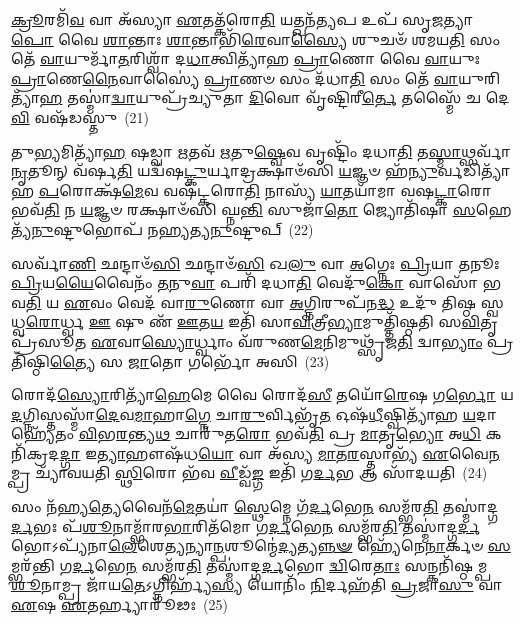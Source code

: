 {\anuvakamend[{𑌐𑌵 \ul{𑌪}\-𑌶𑍂𑌨𑌿𑌤𑌿᳴ 𑌗𑍃𑌣𑌾𑌤𑌿 𑌹𑍋\-\ul{𑌤}\-𑌰𑌿𑌤𑌿᳴ \ul{𑌸}\-𑌪𑍍𑌤𑌵𑌿𑍞᳴𑌶𑌤𑌿𑌶𑍍𑌚}]}%

\-\ul{𑌕𑍍𑌰𑍂}\-𑌰𑌮𑌿᳴\-\ul{𑌵} 𑌵𑌾 𑌅᳴𑌸𑍍𑌯𑌾 \ul{𑌏}\-𑌤𑌤𑍍𑌕᳴𑌰𑍋\-\ul{𑌤𑌿} 𑌯𑌤𑍍𑌖𑌨᳴\-\ul{𑌤𑍍𑌯}\-𑌪 𑌉𑌪᳴ 𑌸𑍃\-\ul{𑌜}\-𑌤𑍍𑌯𑌾\-\ul{𑌪𑍋} 𑌵𑍈 \ul{𑌶𑌾}\-𑌨𑍍𑌤𑌾𑌃 \ul{𑌶𑌾}\-𑌨𑍍𑌤𑌾𑌭𑌿᳴\-\ul{𑌰𑍇}\-𑌵𑌾\-\ul{𑌸𑍍𑌯𑍈} 𑌶𑍁𑌚𑍞᳴ 𑌶𑌮𑌯\-\ul{𑌤𑌿} 𑌸𑌂 𑌤𑍇᳴ \ul{𑌵𑌾}\-𑌯𑍁𑌰𑍍𑌮𑌾᳴\-\ul{𑌤}\-𑌰𑌿𑌶𑍍𑌵𑌾᳴ 𑌦\-\ul{𑌧𑌾}\-𑌤𑍍𑌵𑌿𑌤𑍍𑌯𑌾᳴𑌹 \ul{𑌪𑍍𑌰𑌾}\-𑌣𑍋 𑌵𑍈 \ul{𑌵𑌾}\-𑌯𑍁𑌃 \ul{𑌪𑍍𑌰𑌾}\-𑌣𑍇\-\ul{𑌨𑍈}\-𑌵𑌾𑌸𑍍𑌯𑍈॑ \ul{𑌪𑍍𑌰𑌾}\-𑌣𑍞 𑌸𑌂 𑌦᳴𑌧𑌾\-\ul{𑌤𑌿} 𑌸𑌂 𑌤𑍇᳴ \ul{𑌵𑌾}\-𑌯𑍁𑌰𑌿𑌤𑍍𑌯𑌾᳴\-\ul{𑌹} 𑌤𑌸𑍍𑌮𑌾॑\-\ul{𑌦𑍍𑌵𑌾}\-𑌯𑍁𑌪𑍍𑌰᳴𑌚𑍍𑌯𑍁𑌤𑌾 \ul{𑌦𑌿}\-𑌵𑍋 𑌵𑍃᳴𑌷𑍍𑌟𑌿𑌰𑍀\-\ul{𑌰𑍍𑌤𑍇} 𑌤𑌸𑍍𑌮𑍈᳴ 𑌚 𑌦𑍇\-\ul{𑌵𑌿} 𑌵𑌷᳴𑌡𑌸𑍍𑌤𑍁~(21)

𑌤𑍁\-\ul{𑌭𑍍𑌯}\-𑌮𑌿𑌤𑍍𑌯𑌾᳴\-\ul{𑌹} 𑌷𑌡𑍍𑌵𑌾 \ul{𑌋}\-𑌤𑌵᳴ \ul{𑌋}\-𑌤𑍁\-\ul{𑌷𑍍𑌵𑍇}\-𑌵 𑌵𑍃𑌷𑍍𑌟𑌿𑌂᳴ 𑌦𑌧𑌾\-\ul{𑌤𑌿} 𑌤\-\ul{𑌸𑍍𑌮𑌾}\-𑌥𑍍𑌸𑌰𑍍𑌵𑌾᳴\-\ul{𑌨𑍃}\-𑌤𑍂𑌨𑍍 𑌵᳴𑌰𑍍\mbox{}𑌷\-\ul{𑌤𑌿} 𑌯𑌦𑍍𑌵᳴𑌷\-\ul{𑌟𑍍𑌕𑍁}\-𑌰𑍍𑌯𑌾𑌦𑍍𑌰𑌕𑍍𑌷𑌾𑍞᳴𑌸𑌿 \ul{𑌯}\-𑌜𑍍𑌞𑍞 𑌹᳴\-\ul{𑌨𑍍𑌯𑍁}\-𑌰𑍍𑌵𑌡𑌿𑌤𑍍𑌯𑌾᳴𑌹 \ul{𑌪}\-𑌰𑍋𑌕𑍍𑌷᳴\-\ul{𑌮𑍇}\-𑌵 𑌵𑌷᳴𑌟𑍍𑌕𑌰𑍋\-\ul{𑌤𑌿} 𑌨𑌾𑌸𑍍𑌯᳴ \ul{𑌯𑌾}\-𑌤𑌯𑌾᳴𑌮𑌾 𑌵𑌷\-\ul{𑌟𑍍𑌕𑌾}\-𑌰𑍋 𑌭𑌵᳴\-\ul{𑌤𑌿} 𑌨 \ul{𑌯}\-𑌜𑍍𑌞𑍞 𑌰𑌕𑍍𑌷𑌾𑍞᳴𑌸𑌿 𑌘𑍍𑌨\-\ul{𑌨𑍍𑌤𑌿} 𑌸𑍁𑌜𑌾᳴\-\ul{𑌤𑍋} 𑌜𑍍𑌯𑍋𑌤𑌿᳴𑌷𑌾 \ul{𑌸}\-𑌹𑍇𑌤𑍍𑌯᳴\-\ul{𑌨𑍁}\-𑌷𑍍𑌟𑍁𑌭𑍋𑌪᳴ 𑌨𑌹𑍍𑌯𑌤𑍍𑌯\-\ul{𑌨𑍁}\-𑌷𑍍𑌟𑍁𑌪𑍍~(22)

𑌸𑌰𑍍𑌵𑌾᳴\-\ul{𑌣𑌿} 𑌛𑌨𑍍𑌦𑌾𑍞᳴\-\ul{𑌸𑌿} 𑌛𑌨𑍍𑌦𑌾𑍞᳴\-\ul{𑌸𑌿} 𑌖\-\ul{𑌲𑍁} 𑌵𑌾 \ul{𑌅}\-𑌗𑍍𑌨𑍇𑌃 \ul{𑌪𑍍𑌰𑌿}\-𑌯𑌾 \ul{𑌤}\-𑌨𑍂𑌃 \ul{𑌪𑍍𑌰𑌿}\-𑌯\-\ul{𑌯𑍈}\-𑌵𑍈𑌨𑌂᳴ \ul{𑌤}\-𑌨𑍁\-\ul{𑌵𑌾} 𑌪𑌰𑌿᳴ 𑌦𑌧𑌾\-\ul{𑌤𑌿} 𑌵𑍇𑌦𑍁᳴\-\ul{𑌕𑍋} 𑌵𑌾𑌸𑍋᳴ 𑌭𑌵\-\ul{𑌤𑌿} 𑌯 \ul{𑌏}\-𑌵𑌂 𑌵𑍇𑌦᳴ 𑌵𑌾\-\ul{𑌰𑍁}\-𑌣𑍋 𑌵𑌾 \ul{𑌅}\-𑌗𑍍𑌨𑌿𑌰𑍁𑌪᳴𑌨\-\ul{𑌦𑍍𑌧} 𑌉𑌦𑍁᳴ 𑌤𑌿𑌷𑍍𑌠 𑌸𑍍𑌵𑌧𑍍𑌵\-\ul{𑌰𑍋}\-𑌰𑍍𑌧𑍍𑌵 \ul{𑌊} 𑌷𑍁 𑌣᳴ \ul{𑌊}\-𑌤\-\ul{𑌯} 𑌇𑌤𑌿᳴ 𑌸𑌾\-\ul{𑌵𑌿}\-𑌤𑍍𑌰𑍀\-\ul{𑌭𑍍𑌯𑌾}\-𑌮𑍁𑌤𑍍𑌤𑌿᳴𑌷𑍍𑌠𑌤𑌿 𑌸\-\ul{𑌵𑌿}\-𑌤𑍃𑌪𑍍𑌰᳴𑌸𑍂𑌤 \ul{𑌏}\-𑌵𑌾\-\ul{𑌸𑍍𑌯𑍋}\-𑌰𑍍𑌧𑍍𑌵𑌾𑌂 𑌵᳴𑌰𑍁𑌣\-\ul{𑌮𑍇}\-𑌨𑌿𑌮𑍁𑌥𑍍𑌸𑍃᳴𑌜\-\ul{𑌤𑌿} 𑌦𑍍𑌵𑌾\-\ul{𑌭𑍍𑌯𑌾𑌂} 𑌪𑍍𑌰𑌤𑌿᳴𑌷𑍍𑌠𑌿\-\ul{𑌤𑍍𑌯𑍈} 𑌸 \ul{𑌜𑌾}\-𑌤𑍋 𑌗𑌰𑍍𑌭𑍋᳴ 𑌅𑌸𑌿~(23)

𑌰𑍋𑌦᳴\-\ul{𑌸𑍍𑌯𑍋}\-𑌰𑌿𑌤𑍍𑌯𑌾᳴\-\ul{𑌹𑍇}\-𑌮𑍇 𑌵𑍈 𑌰𑍋𑌦᳴\-\ul{𑌸𑍀} 𑌤𑌯𑍋᳴\-\ul{𑌰𑍇}\-𑌷 𑌗\-\ul{𑌰𑍍𑌭𑍋} 𑌯\-\ul{𑌦}\-𑌗𑍍𑌨𑌿𑌸𑍍𑌤𑌸𑍍𑌮𑌾᳴\-\ul{𑌦𑍇}\-𑌵\-\ul{𑌮𑌾}\-𑌹𑌾\-\ul{𑌗𑍍𑌨𑍇} 𑌚𑌾\-\ul{𑌰𑍁}\-𑌰𑍍𑌵𑌿𑌭𑍃᳴\-\ul{𑌤} 𑌓𑌷᳴\-\ul{𑌧𑍀}\-𑌷𑍍𑌵𑌿𑌤𑍍𑌯𑌾᳴𑌹 \ul{𑌯}\-𑌦𑌾 𑌹𑍍𑌯𑍇᳴𑌤𑌂 \ul{𑌵𑌿}\-𑌭\-\ul{𑌰}\-𑌨𑍍𑌤𑍍𑌯\-\ul{𑌥} 𑌚𑌾𑌰𑍁᳴𑌤\-\ul{𑌰𑍋} 𑌭𑌵᳴\-\ul{𑌤𑌿} 𑌪𑍍𑌰 \ul{𑌮𑌾}\-𑌤𑍃\-\ul{𑌭𑍍𑌯𑍋} 𑌅\-\ul{𑌧𑌿} 𑌕𑌨𑌿᳴𑌕𑍍𑌰𑌦\-\ul{𑌦𑍍𑌗𑌾} 𑌇\-\ul{𑌤𑍍𑌯𑌾}\-𑌹𑍗𑌷᳴𑌧\-\ul{𑌯𑍋} 𑌵𑌾 𑌅᳴𑌸𑍍𑌯 \ul{𑌮𑌾}\-𑌤\-\ul{𑌰}\-𑌸𑍍𑌤𑌾𑌭𑍍𑌯᳴ \ul{𑌏}\-𑌵𑍈\-\ul{𑌨}\-𑌮𑍍𑌪𑍍𑌰 𑌚𑍍𑌯𑌾᳴𑌵𑌯𑌤𑌿 \ul{𑌸𑍍𑌥𑌿}\-𑌰𑍋 𑌭᳴𑌵 \ul{𑌵𑍀}\-𑌡𑍍𑌵᳴\-\ul{𑌙𑍍𑌗} 𑌇𑌤𑌿᳴ 𑌗\-\ul{𑌰𑍍𑌦}\-𑌭 𑌆 𑌸𑌾᳴𑌦𑌯𑌤𑌿~(24)

𑌸𑌂 𑌨᳴𑌹𑍍𑌯\-\ul{𑌤𑍍𑌯𑍇}\-𑌵𑍈𑌨᳴\-\ul{𑌮𑍇}\-𑌤𑌯𑌾॑ \ul{𑌸𑍍𑌥𑍇}\-𑌮𑍍𑌨𑍇 𑌗᳴\-\ul{𑌰𑍍𑌦}\-𑌭𑍇\-\ul{𑌨} 𑌸𑌮𑍍𑌭᳴𑌰\-\ul{𑌤𑌿} 𑌤𑌸𑍍𑌮𑌾॑𑌦𑍍𑌗\-\ul{𑌰𑍍𑌦}\-𑌭𑌃 𑌪᳴\-\ul{𑌶𑍂}\-𑌨𑌾𑌮𑍍𑌭𑌾᳴𑌰\-\ul{𑌭𑌾}\-𑌰𑌿𑌤᳴𑌮𑍋 𑌗\-\ul{𑌰𑍍𑌦}\-𑌭𑍇\-\ul{𑌨} 𑌸𑌮𑍍𑌭᳴𑌰\-\ul{𑌤𑌿} 𑌤𑌸𑍍𑌮𑌾॑𑌦𑍍𑌗\-\ul{𑌰𑍍𑌦}\-𑌭𑍋\-𑌽𑌪𑍍𑌯᳴𑌨𑌾\-\ul{𑌲𑍇}\-𑌶𑍇\-\ul{𑌤𑍍𑌯}\-𑌨𑍍𑌯𑌾\-\ul{𑌨𑍍𑌪}\-𑌶𑍂𑌨𑍍𑌮𑍇॑\-\ul{𑌦𑍍𑌯}\-𑌤𑍍𑌯\-\ul{𑌨𑍍𑌨}\-\-\ul{𑍟} 𑌹𑍍𑌯𑍇᳴𑌨𑍇\-\ul{𑌨𑌾}\-𑌰𑍍𑌕𑍞 \ul{𑌸}\-𑌮𑍍𑌭𑌰᳴𑌨𑍍𑌤𑌿 𑌗\-\ul{𑌰𑍍𑌦}\-𑌭𑍇\-\ul{𑌨} 𑌸𑌮𑍍𑌭᳴𑌰\-\ul{𑌤𑌿} 𑌤𑌸𑍍𑌮𑌾॑𑌦𑍍𑌗\-\ul{𑌰𑍍𑌦}\-𑌭𑍋 \ul{𑌦𑍍𑌵𑌿}\-𑌰𑍇\-\ul{𑌤𑌾𑌃} 𑌸𑌨𑍍𑌕𑌨𑌿᳴𑌷𑍍𑌠𑌮𑍍𑌪\-\ul{𑌶𑍂}\-𑌨𑌾𑌮𑍍𑌪𑍍𑌰 𑌜𑌾᳴𑌯\-\ul{𑌤𑍇}\-\-𑌽𑌗𑍍𑌨𑌿𑌰𑍍𑌹𑍍𑌯᳴\-\ul{𑌸𑍍𑌯} 𑌯𑍋𑌨𑌿𑌂᳴ \ul{𑌨𑌿}\-𑌰𑍍𑌦𑌹᳴𑌤𑌿 \ul{𑌪𑍍𑌰}\-𑌜𑌾\-\ul{𑌸𑍁} 𑌵𑌾 \ul{𑌏}\-𑌷 \ul{𑌏}\-𑌤𑌰𑍍\mbox{}𑌹𑍍𑌯𑌾𑌰𑍂᳴𑌢𑌃~(25)

